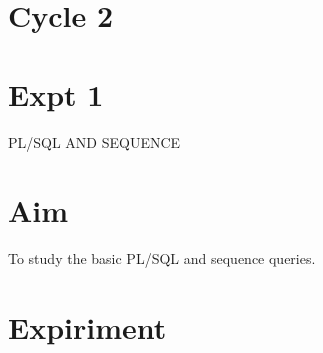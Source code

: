 \documentclass[13pt,oneside]{book}
\begin{document}
\section*{Cycle 2}
\section*{Expt 1}
\begin{center}
    \Large{PL/SQL AND SEQUENCE}
\end{center}

\section*{Aim}
\large To study the basic PL/SQL and sequence queries.
\section*{Expiriment}
\end{document}
